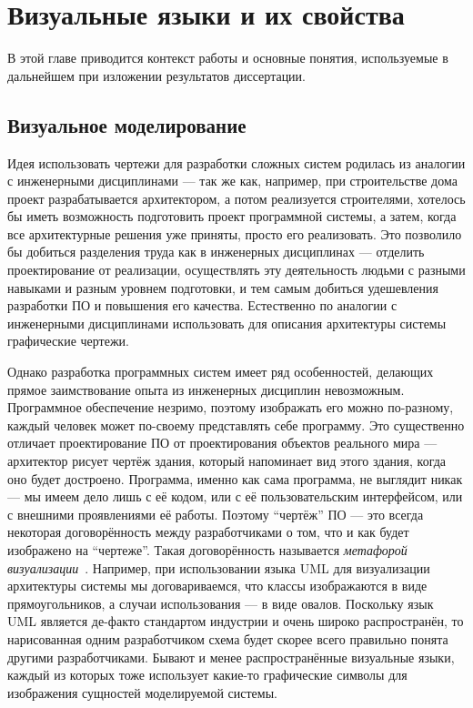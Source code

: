 \chapter{Визуальные языки и их свойства}
\label{chapter1}

В этой главе приводится контекст работы и основные понятия, используемые в 
дальнейшем при изложении результатов диссертации. 

\section{Визуальное моделирование}
Идея использовать чертежи для разработки сложных систем родилась из аналогии с 
инженерными дисциплинами --- так же как, например, при строительстве дома проект 
разрабатывается архитектором, а потом реализуется строителями, хотелось бы иметь 
возможность подготовить проект программной системы, а затем, когда все 
архитектурные решения уже приняты, просто его реализовать. Это позволило бы 
добиться разделения труда как в инженерных дисциплинах --- отделить 
проектирование от реализации, осуществлять эту деятельность людьми с разными 
навыками и разным уровнем подготовки, и тем самым добиться удешевления разработки 
ПО и повышения его качества. Естественно по аналогии с инженерными дисциплинами 
использовать для описания архитектуры системы графические чертежи.

Однако разработка программных систем имеет ряд особенностей, делающих прямое 
заимствование опыта из инженерных дисциплин невозможным. Программное обеспечение 
незримо, поэтому изображать его можно по-разному, каждый человек может по-своему 
представлять себе программу. Это существенно отличает проектирование ПО от 
проектирования объектов реального мира --- архитектор рисует чертёж здания, 
который напоминает вид этого здания, когда оно будет достроено. Программа, 
именно как сама программа, не выглядит никак --- мы имеем дело лишь с её кодом, 
или с её пользовательским интерфейсом, или с внешними проявлениями её работы. 
Поэтому "`чертёж"' ПО --- это всегда некоторая договорённость между 
разработчиками о том, что и как будет изображено на "`чертеже"'. Такая договорённость называется 
\textit{метафорой визуализации}~\cite{averbukh2001visualization}. Например, при использовании 
языка UML для визуализации архитектуры системы мы договариваемся, что классы 
изображаются в виде прямоугольников, а случаи использования --- в виде овалов. 
Поскольку язык UML является де-факто стандартом индустрии и очень широко 
распространён, то нарисованная одним разработчиком схема будет скорее всего 
правильно понята другими разработчиками. Бывают и менее распространённые 
визуальные языки, каждый из которых тоже использует какие-то графические символы 
для изображения сущностей моделируемой системы.

